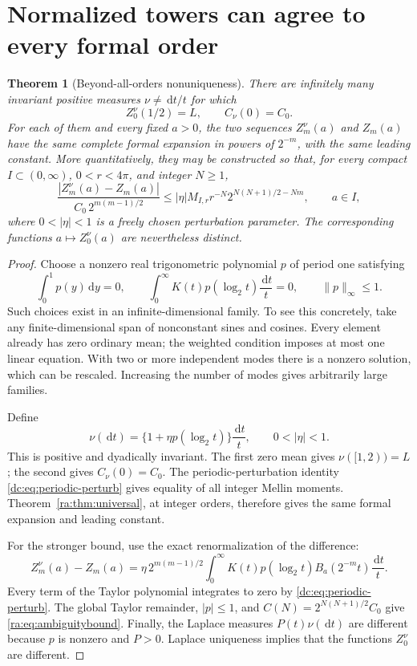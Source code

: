\documentclass[11pt,a4paper,oneside,openany]{book}
\numberwithin{equation}{chapter}
\newtheorem{theorem}{Theorem}[chapter]
\theoremstyle{definition}
\theoremstyle{remark}
\newcommand{\dd}{\,\mathrm d}
\newcommand{\W}{K}
\begin{document}
\section{Normalized towers can agree to every formal order}
\begin{theorem}[Beyond-all-orders nonuniqueness]\label{ra:thm:ambiguity}
There are infinitely many invariant positive measures $\nu\ne\dd t/t$
for which
\begin{equation}\label{ra:eq:ambiguitynormalizations}
 Z_0^\nu(1/2)=L,\qquad C_\nu(0)=C_0.
\end{equation}
For each of them and every fixed $a>0$, the two sequences
$Z_m^\nu(a)$ and $Z_m(a)$ have the same complete formal expansion in
powers of $2^{-m}$, with the same leading constant.
More quantitatively, they may be constructed so that, for every compact
$I\subset(0,\infty)$, $0<r<4\pi$, and integer $N\ge1$,
\begin{equation}\label{ra:eq:ambiguitybound}
 \frac{|Z_m^\nu(a)-Z_m(a)|}{C_0\,2^{m(m-1)/2}}
 \le |\eta|M_{I,r}r^{-N}2^{N(N+1)/2-Nm},\qquad a\in I,
\end{equation}
where $0<|\eta|<1$ is a freely chosen perturbation parameter.
The corresponding functions $a\mapsto Z_0^\nu(a)$ are nevertheless distinct.
\end{theorem}
\begin{proof}
Choose a nonzero real trigonometric polynomial $p$ of period one satisfying
\begin{equation}\label{ra:eq:twopconditions}
 \int_0^1p(y)\dd y=0,\qquad
 \int_0^\infty\W(t)p(\log_2t)\frac{\dd t}{t}=0,
 \qquad \|p\|_\infty\le1.
\end{equation}
Such choices exist in an infinite-dimensional family. To see this
concretely, take any finite-dimensional span of nonconstant sines and
cosines. Every element already has zero ordinary mean; the weighted
condition imposes at most one linear equation. With two or more
independent modes there is a nonzero solution, which can be rescaled.
Increasing the number of modes gives arbitrarily large families.

Define
\begin{equation}\label{ra:eq:nupperturb}
 \nu(\dd t)=\{1+\eta p(\log_2t)\}\frac{\dd t}{t},
 \qquad0<|\eta|<1.
\end{equation}
This is positive and dyadically invariant. The first zero mean gives
$\nu([1,2))=L$; the second gives $C_\nu(0)=C_0$.
The periodic-perturbation identity \eqref{dc:eq:periodic-perturb} gives equality of all integer Mellin moments.
Theorem~\ref{ra:thm:universal}, at integer orders, therefore gives the same
formal expansion and leading constant.

For the stronger bound, use the exact renormalization of the difference:
\[
 Z_m^\nu(a)-Z_m(a)
 =\eta\,2^{m(m-1)/2}\int_0^\infty
       \W(t)p(\log_2t)B_a(2^{-m}t)\frac{\dd t}{t}.
\]
Every term of the Taylor polynomial integrates to zero by
\eqref{dc:eq:periodic-perturb}. The global Taylor remainder, $|p|\le1$, and
$C(N)=2^{N(N+1)/2}C_0$ give \eqref{ra:eq:ambiguitybound}.
Finally, the Laplace measures $P(t)\nu(\dd t)$ are different because
$p$ is nonzero and $P>0$. Laplace uniqueness implies that the functions
$Z_0^\nu$ are different.
\end{proof}
\end{document}
